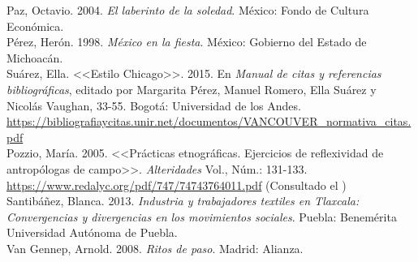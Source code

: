 \documentclass[14pt,letterpaper,twoside]{extbook} %
\begin{document}
\noindent Paz, Octavio. 2004. \textit{El laberinto de la soledad}. México: Fondo de Cultura Económica.\\

\noindent Pérez, Herón. 1998. \textit{México en la fiesta}. México: Gobierno del Estado de Michoacán.\\

\noindent Suárez, Ella. <<Estilo Chicago>>. 2015. En \textit{Manual de citas y referencias bibliográficas}, editado por Margarita Pérez, Manuel Romero, Ella Suárez y Nicolás Vaughan, 33-55. Bogotá: Universidad de los Andes. \url{https://bibliografiaycitas.unir.net/documentos/VANCOUVER_normativa_citas.pdf} \\

\noindent Pozzio, María. 2005. <<Prácticas etnográficas. Ejercicios de reflexividad de antropólogas de campo>>. \textit{Alteridades} Vol., Núm.: 131-133. \url{https://www.redalyc.org/pdf/747/74743764011.pdf} (Consultado el ) \\

\noindent Santibáñez, Blanca. 2013. \textit{Industria y trabajadores textiles en Tlaxcala: Convergencias y divergencias en los movimientos sociales}. Puebla: Benemérita Universidad Autónoma de Puebla.\\

\noindent Van Gennep, Arnold. 2008. \textit{Ritos de paso}. Madrid: Alianza.\\


\newpage
\pagestyle{fancy}
\fancyhf{}
\fancyfoot[RO,LE]{\hfill \thepage \hfill}
\printindex[nombres]

\newpage
\pagestyle{fancy}
\fancyhf{}
\fancyfoot[RO,LE]{\hfill \thepage \hfill}
\printindex[lugares]

\newpage
\pagestyle{empty}
\null\vfill

\newpage
\pagestyle{empty}
\null\vfill
\end{document}
